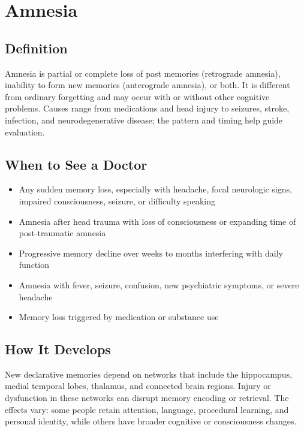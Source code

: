 \chapter{Amnesia}

\section*{Definition}
Amnesia is partial or complete loss of past memories (retrograde amnesia), inability to form new memories (anterograde amnesia), or both. It is different from ordinary forgetting and may occur with or without other cognitive problems. Causes range from medications and head injury to seizures, stroke, infection, and neurodegenerative disease; the pattern and timing help guide evaluation.

\section*{When to See a Doctor}

\begin{itemize}
 \item Any sudden memory loss, especially with headache, focal neurologic signs, impaired consciousness, seizure, or difficulty speaking
 \item Amnesia after head trauma with loss of consciousness or expanding time of post-traumatic amnesia
 \item Progressive memory decline over weeks to months interfering with daily function
 \item Amnesia with fever, seizure, confusion, new psychiatric symptoms, or severe headache
 \item Memory loss triggered by medication or substance use
\end{itemize}

\section*{How It Develops}
New declarative memories depend on networks that include the hippocampus, medial temporal lobes, thalamus, and connected brain regions. Injury or dysfunction in these networks can disrupt memory encoding or retrieval. The effects vary: some people retain attention, language, procedural learning, and personal identity, while others have broader cognitive or consciousness changes.

